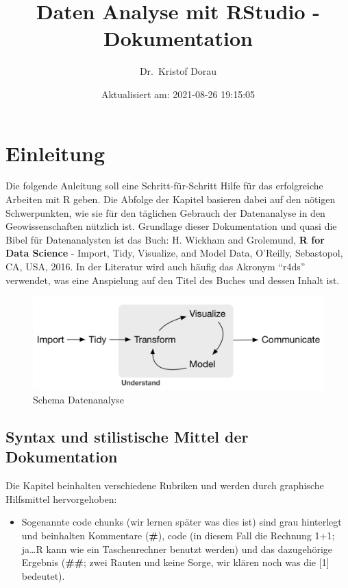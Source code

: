 \documentclass[
]{article}
\title{Daten Analyse mit RStudio - Dokumentation}
\author{Dr.~Kristof Dorau}
\date{Aktualisiert am: 2021-08-26 19:15:05}
\providecommand{\tightlist}{%
  \setlength{\itemsep}{0pt}\setlength{\parskip}{0pt}}
\begin{document}
\maketitle

{
\setcounter{tocdepth}{2}
\tableofcontents
}
\hypertarget{einleitung}{%
\section{Einleitung}\label{einleitung}}

Die folgende Anleitung soll eine Schritt-für-Schritt Hilfe für das erfolgreiche Arbeiten mit R geben. Die Abfolge der Kapitel basieren dabei auf den nötigen Schwerpunkten, wie sie für den täglichen Gebrauch der Datenanalyse in den Geowissenschaften nützlich ist. Grundlage dieser Dokumentation und quasi die Bibel für Datenanalysten ist das Buch: H. Wickham and Grolemund, \textbf{R for Data Science} - Import, Tidy, Visualize, and Model Data, O'Reilly, Sebastopol, CA, USA, 2016. In der Literatur wird auch häufig das Akronym ``r4ds'' verwendet, was eine Anspielung auf den Titel des Buches und dessen Inhalt ist.

\begin{figure}

{\centering \includegraphics[width=1\linewidth]{images/001} 

}

\caption{Schema Datenanalyse}\label{fig:unnamed-chunk-2}
\end{figure}

\hypertarget{syntax-und-stilistische-mittel-der-dokumentation}{%
\subsection{Syntax und stilistische Mittel der Dokumentation}\label{syntax-und-stilistische-mittel-der-dokumentation}}

Die Kapitel beinhalten verschiedene Rubriken und werden durch graphische Hilfsmittel hervorgehoben:

\begin{itemize}
\tightlist
\item
  Sogenannte code chunks (wir lernen später was dies ist) sind grau hinterlegt und beinhalten Kommentare (\textbf{\#}), code (in diesem Fall die Rechnung 1+1; ja\ldots R kann wie ein Taschenrechner benutzt werden) und das dazugehörige Ergebnis (\textbf{\#\#}; zwei Rauten und keine Sorge, wir klären noch was die {[}1{]} bedeutet).
\end{itemize}
\end{document}
